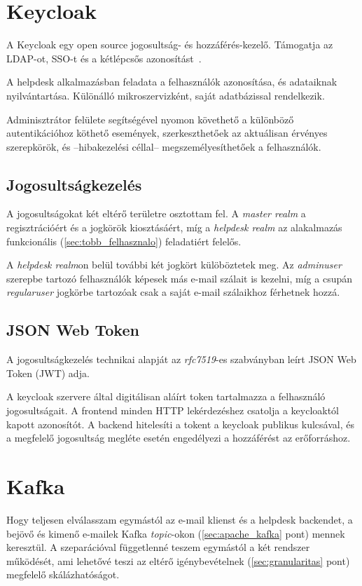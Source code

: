 \section{Keycloak}
A Keycloak egy open source jogosultság- és hozzáférés-kezelő. Támogatja az LDAP-ot, SSO-t és a kétlépcsős azonosítást~\cite{Keycloak_website}. 

A helpdesk alkalmazásban feladata a felhasználók azonosítása, és adataiknak nyilvántartása. Különálló mikroszervizként, saját adatbázissal rendelkezik.

Adminisztrátor felülete segítségével nyomon követhető a különböző autentikációhoz köthető események, szerkeszthetőek az aktuálisan érvényes szerepkörök, és --hibakezelési céllal-- megszemélyesíthetőek a felhasználók.


\subsection{Jogosultságkezelés}
A jogosultságokat két eltérő területre osztottam fel. A \textit{master realm} a regisztrációért és a jogkörök kiosztásáért, míg a \textit{helpdesk realm} az alakalmazás funkcionális (\ref{sec:tobb_felhasznalo}) feladatiért felelős.

A \textit{helpdesk realm}on belül további két jogkört külöböztetek meg. Az \textit{admin\textunderscore user} szerepbe tartozó felhasználók képesek más e-mail szálait is kezelni, míg a csupán \textit{regular\textunderscore user} jogkörbe tartozóak csak a saját e-mail szálaikhoz férhetnek hozzá.


\subsection{JSON Web Token}
A jogosultságkezelés technikai alapját az \textit{rfc7519}-es szabványban \cite{rfc7519_JSON_Web_Token} leírt JSON Web Token (JWT) adja. 

A keycloak szervere által digitálisan aláírt token tartalmazza a felhasználó jogosultságait. A frontend minden HTTP lekérdezéshez csatolja a keycloaktól kapott azonosítót. A backend hitelesíti a tokent a keycloak publikus kulcsával, és a megfelelő jogosultság megléte esetén engedélyezi a hozzáférést az erőforráshoz.


\section{Kafka}
Hogy teljesen elválasszam egymástól az e-mail klienst és a helpdesk backendet, a bejövő és kimenő e-mailek Kafka \textit{topic}-okon (\ref{sec:apache_kafka} pont) mennek keresztül. A szeparációval függetlenné teszem egymástól a két rendszer működését, ami lehetővé teszi az eltérő igénybevételnek (\ref{sec:granularitas} pont) megfelelő skálázhatóságot.